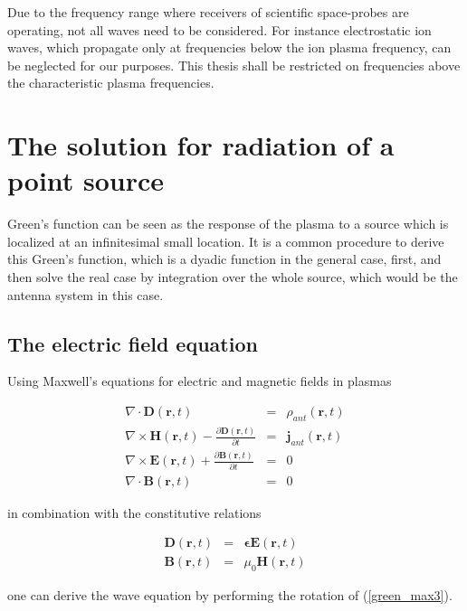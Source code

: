 \documentclass[a4paper,11pt]{thesis}
\begin{document}
Due to the frequency range where receivers of scientific space-probes are operating, not all waves need to be considered. For instance electrostatic ion waves, which propagate only at frequencies below the ion plasma frequency, can be neglected for our purposes. This thesis shall be restricted on frequencies above the characteristic plasma frequencies.

\section{The solution for radiation of a point source}
Green's function can be seen as the response of the plasma to a source which is localized at an infinitesimal small location. It is a common procedure to derive this Green's function, which is a dyadic function in the general case, first, and then solve the real case by integration over the whole source, which would be the antenna system in this case.\\

\subsection{The electric field equation}
Using Maxwell's equations for electric and magnetic fields in plasmas

\begin{eqnarray}
  \nabla \cdot \mathbf{D}(\mathbf{r},t) &=& \rho_{ant}(\mathbf{r},t) \\
\nabla \times \mathbf{H}(\mathbf{r},t)- \frac{\partial \mathbf{D}(\mathbf{r},t)}{\partial t}&=& \mathbf{j}_{ant}(\mathbf{r},t) \label{green_max2} \\
\nabla \times \mathbf{E}(\mathbf{r},t) + \frac{\partial \mathbf{B}(\mathbf{r},t)}{\partial t} &=& 0 \label{green_max3}\\
\nabla \cdot \mathbf{B}(\mathbf{r},t) &=& 0
\end{eqnarray}

in combination with the constitutive relations

\begin{eqnarray}
    \mathbf{D}(\mathbf{r},t)&=&\mathbf{\epsilon} \mathbf{E}(\mathbf{r},t)\label{green_consti1}\\
\mathbf{B}(\mathbf{r},t)&=& \mu_0  \mathbf{H}(\mathbf{r},t)\label{green_consti2}
\end{eqnarray}

one can derive the wave equation by performing the rotation of (\ref{green_max3}).
\end{document}
